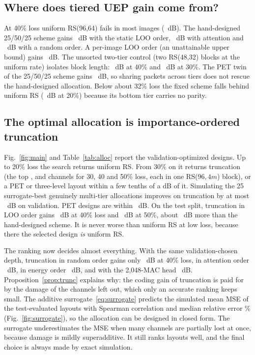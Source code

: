 \subsection{Where does tiered UEP gain come from?}
At 40\% loss uniform RS(96,64) fails in most images (\UniformForty~dB). The hand-designed 25/50/25 scheme
gains \HandTierGainForty~dB with the static LOO order, \HandTierAttentionGainForty~dB with attention and
\HandTierRandomGainForty~dB with a random order. A per-image LOO order (an unattainable upper bound) gains
\HandTierPerImageGainForty~dB. The unsorted two-tier control (two RS(48,32) blocks at the uniform rate)
isolates block length: \TwoTierUnsortedGainForty~dB at 40\% and \TwoTierUnsortedGainThirty~dB at 30\%. The
PET twin of the 25/50/25 scheme gains \PetTwinGainForty~dB, so sharing packets across tiers does not
rescue the hand-designed allocation. Below about 32\% loss the fixed scheme falls
behind uniform RS (\HandTierGainTwenty~dB at 20\%) because its bottom tier carries no parity.

\subsection{The optimal allocation is importance-ordered truncation}
Fig.~\ref{fig:main} and Table~\ref{tab:alloc} report the validation-optimized designs. Up to 20\% loss the
search returns uniform RS. From 30\% on it returns truncation (the top \TruncKeepThirty, \TruncKeepForty{}
and \TruncKeepFifty{} channels for 30, 40 and 50\% loss, each in one RS($96,4m$) block), or a PET or
three-level layout within a few tenths of a dB of it. Simulating the 25 surrogate-best genuinely multi-tier allocations improves on
truncation by at most \MultiTierMaxGain~dB on validation. PET designs are within \PetVsTruncMax~dB. On the
test split, truncation in LOO order gains \TruncOracleGainForty~dB at 40\% loss and
\TruncOracleGainFifty~dB at 50\%, about \TruncOverHandForty~dB more than the hand-designed scheme. It is
never worse than uniform RS at low loss, because there the selected design \emph{is} uniform RS.

The ranking now decides almost everything. With the same validation-chosen depth, truncation in random
order gains only \TruncRandomGainForty~dB at 40\% loss, in attention order \TruncAttentionGainForty~dB,
in energy order \TruncEnergyGainForty~dB, and with the 2,048-MAC head \TruncHeadGainForty~dB.
Proposition~\ref{prop:trunc} explains why: the coding gain of truncation is paid for by the damage of the
channels left out, which only an accurate ranking keeps small. The additive surrogate~\eqref{eq:surrogate}
predicts the simulated mean MSE of the test-evaluated layouts with Spearman correlation
\SurrogateSpearman{} and median relative error \SurrogateMedianRelErr\% (Fig.~\ref{fig:surrogate}), so the
allocation can be designed in closed form. The surrogate underestimates the MSE when many channels are
partially lost at once, because damage is mildly superadditive. It still ranks layouts well, and the final
choice is always made by exact simulation.

